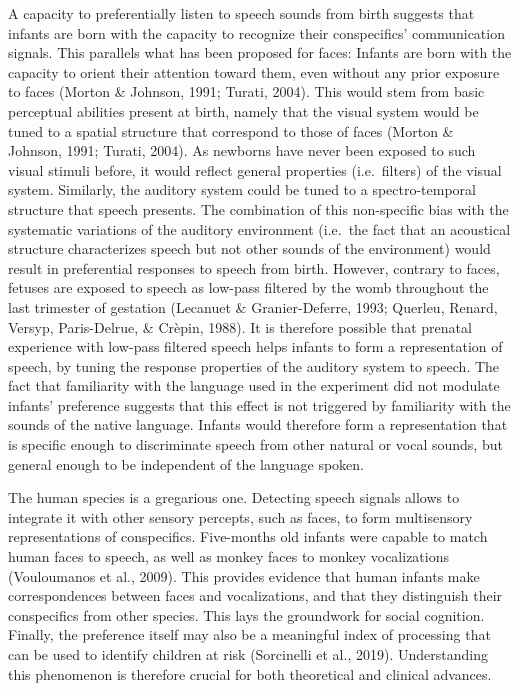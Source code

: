 \documentclass[
  english,
  man]{apa6}
\begin{document}
A capacity to preferentially listen to speech sounds from birth suggests that infants are born with the capacity to recognize their conspecifics' communication signals. This parallels what has been proposed for faces: Infants are born with the capacity to orient their attention toward them, even without any prior exposure to faces (Morton \& Johnson, 1991; Turati, 2004). This would stem from basic perceptual abilities present at birth, namely that the visual system would be tuned to a spatial structure that correspond to those of faces (Morton \& Johnson, 1991; Turati, 2004). As newborns have never been exposed to such visual stimuli before, it would reflect general properties (i.e.~filters) of the visual system. Similarly, the auditory system could be tuned to a spectro-temporal structure that speech presents. The combination of this non-specific bias with the systematic variations of the auditory environment (i.e.~the fact that an acoustical structure characterizes speech but not other sounds of the environment) would result in preferential responses to speech from birth. However, contrary to faces, fetuses are exposed to speech as low-pass filtered by the womb throughout the last trimester of gestation (Lecanuet \& Granier-Deferre, 1993; Querleu, Renard, Versyp, Paris-Delrue, \& Crèpin, 1988). It is therefore possible that prenatal experience with low-pass filtered speech helps infants to form a representation of speech, by tuning the response properties of the auditory system to speech.
The fact that familiarity with the language used in the experiment did not modulate infants' preference suggests that this effect is not triggered by familiarity with the sounds of the native language. Infants would therefore form a representation that is specific enough to discriminate speech from other natural or vocal sounds, but general enough to be independent of the language spoken.

The human species is a gregarious one. Detecting speech signals allows to integrate it with other sensory percepts, such as faces, to form multisensory representations of conspecifics. Five-months old infants were capable to match human faces to speech, as well as monkey faces to monkey vocalizations (Vouloumanos et al., 2009). This provides evidence that human infants make correspondences between faces and vocalizations, and that they distinguish their conspecifics from other species. This lays the groundwork for social cognition. Finally, the preference itself may also be a meaningful index of processing that can be used to identify children at risk (Sorcinelli et al., 2019). Understanding this phenomenon is therefore crucial for both theoretical and clinical advances.
\end{document}
